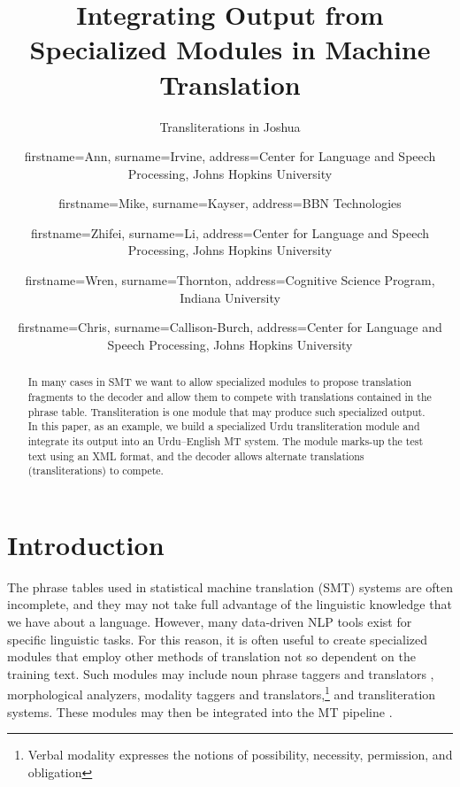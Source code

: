 \documentclass[logo]{pbml}
\begin{document}
\title{Integrating Output from Specialized Modules in Machine Translation}

\subtitle{Transliterations in Joshua}


\author{firstname=Ann, surname=Irvine,
       address={Center for Language and Speech Processing, Johns Hopkins University}}
\author{firstname=Mike, surname=Kayser, address={BBN Technologies}}
\author{firstname=Zhifei, surname=Li,
        address={Center for Language and Speech Processing, Johns Hopkins University}}
\author{firstname=Wren, surname=Thornton,
        address={Cognitive Science Program, Indiana University}}
\author{firstname=Chris, surname=Callison-Burch,
        address={Center for Language and Speech Processing, Johns Hopkins University}}



\maketitle


\begin{abstract}
In many cases in SMT we want to allow specialized modules to propose translation fragments to the decoder and allow them to compete with translations contained in the phrase table. Transliteration is one module that may produce such specialized output. In this paper, as an example, we build a specialized Urdu transliteration module and integrate its output into an Urdu--English MT system. The module marks-up the test text using an XML format, and the decoder allows alternate translations (transliterations) to compete.
\end{abstract}

\section{Introduction}
The phrase tables used in statistical machine translation (SMT) systems are often incomplete, and they may not take full advantage of the linguistic knowledge that we have about a language. However, many data-driven NLP tools exist for specific linguistic tasks. For this reason, it is often useful to create specialized modules that employ other methods of translation not so dependent on the training text. Such modules may include noun phrase taggers and translators \cite{Koehn2004a}, morphological analyzers, modality taggers and translators,\footnote{Verbal modality expresses the notions of possibility, necessity, permission, and obligation} and transliteration systems. These modules may then be integrated into the MT pipeline \cite{Dugast2007, Yang2006}.
\end{document}
